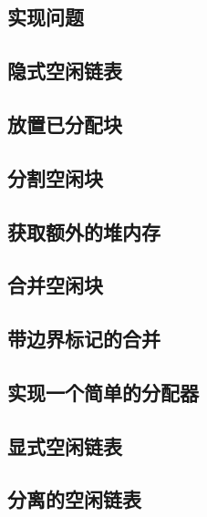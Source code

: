 \pending

\subsection{实现问题}

\pending

\subsection{隐式空闲链表}

\pending

\subsection{放置已分配块}

\pending

\subsection{分割空闲块}

\pending

\subsection{获取额外的堆内存}

\pending

\subsection{合并空闲块}

\pending

\subsection{带边界标记的合并}

\pending

\subsection{实现一个简单的分配器}

\pending

\subsection{显式空闲链表}

\pending

\subsection{分离的空闲链表}

